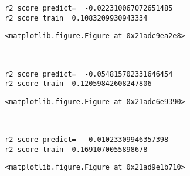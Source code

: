 \documentclass[11pt]{article}
\begin{document}
    \begin{Verbatim}[commandchars=\\\{\}]
r2 score predict=  -0.022310067072651485
r2 score train  0.1083209930943334

    \end{Verbatim}

    
    \begin{verbatim}
<matplotlib.figure.Figure at 0x21adc9ea2e8>
    \end{verbatim}

    
    \begin{center}
    \end{center}
    { \hspace*{\fill} \\}
    
    \begin{Verbatim}[commandchars=\\\{\}]
r2 score predict=  -0.054815702331646454
r2 score train  0.12059842608247806

    \end{Verbatim}

    
    \begin{verbatim}
<matplotlib.figure.Figure at 0x21adc6e9390>
    \end{verbatim}

    
    \begin{center}
    \end{center}
    { \hspace*{\fill} \\}
    
    \begin{Verbatim}[commandchars=\\\{\}]
r2 score predict=  -0.01023309946357398
r2 score train  0.1691070055898678

    \end{Verbatim}

    
    \begin{verbatim}
<matplotlib.figure.Figure at 0x21ad9e1b710>
    \end{verbatim}

    
    \begin{center}
    \end{center}
    { \hspace*{\fill} \\}
    
\end{document}
